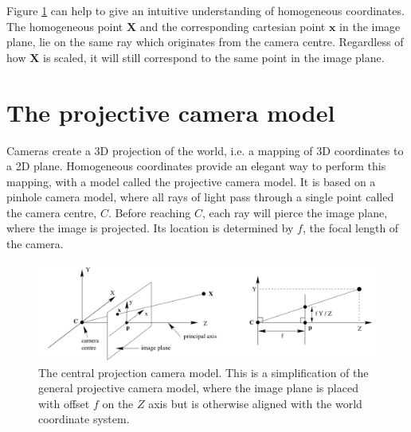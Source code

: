 Figure \ref{fig:central_projection_camera} can help to give an intuitive understanding of homogeneous coordinates.
The homogeneous point $\textbf{X}$ and the corresponding cartesian point $\textbf{x}$ in the image plane, lie on the same ray which originates from the camera centre.
Regardless of how $\textbf{X}$ is scaled, it will still correspond to the same point in the image plane.

\section{The projective camera model}\label{camera-model}
Cameras create a 3D projection of the world, i.e. a mapping of 3D coordinates to a 2D plane.
Homogeneous coordinates provide an elegant way to perform this mapping, with a model called the projective camera model.
It is based on a pinhole camera model, where all rays of light pass through a single point called the camera centre, $C$. Before reaching $C$, each ray will pierce the image plane, where the image is projected.
Its location is determined by $f$, the focal length of the camera.

\begin{figure}
\begin{center}
\includegraphics[width=1.0\textwidth]{figures/central_projection_camera.png}
\end{center}
\caption[The projective camera model]{The central projection camera model. This is a simplification of the general projective camera model, where the image plane is placed with offset $f$ on the $Z$ axis but is otherwise aligned with the world coordinate system.}
\label{fig:central_projection_camera}
\end{figure}

